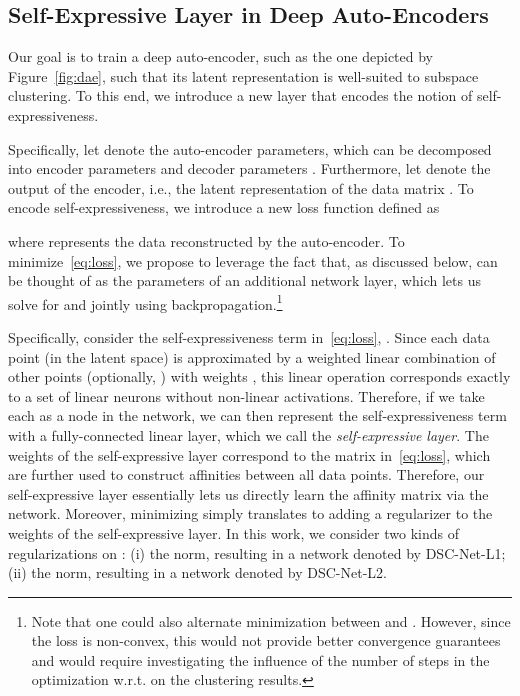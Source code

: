 \documentclass{article}
\begin{document}
\subsection{Self-Expressive Layer in Deep Auto-Encoders}

Our goal is to train a deep auto-encoder, such as the one depicted by  Figure~\ref{fig:dae}, such that its latent representation is well-suited to subspace clustering. To this end, we introduce a new layer that encodes the notion of self-expressiveness. 

Specifically, let  denote the auto-encoder parameters, which can be decomposed into encoder parameters  and decoder parameters . Furthermore, let  denote the output of the encoder, i.e., the latent representation of the data matrix . To encode self-expressiveness, we introduce a new loss function defined as

where  represents the data reconstructed by the auto-encoder. To minimize~\eqref{eq:loss}, we propose to leverage the fact that, as discussed below,  can be thought of as the parameters of an additional network layer, which lets us solve for  and  jointly using backpropagation.\footnote{Note that one could also alternate minimization between  and . However, since the loss is non-convex, this would not provide better convergence guarantees and would require investigating the influence of the number of steps in the optimization w.r.t.  on the clustering results.} 



Specifically, consider the self-expressiveness term in~\eqref{eq:loss},  . Since each data point  (in the latent space) is approximated by a weighted linear combination of other points  (optionally, ) with weights , this linear operation corresponds exactly to a set of linear neurons without non-linear activations. Therefore, if we take each  as a node in the network, we can then represent the self-expressiveness term with a fully-connected linear layer, which we call the {\it self-expressive layer}. The weights of the self-expressive layer correspond to the matrix  in~\eqref{eq:loss}, which are further used to construct affinities between all data points. Therefore, our self-expressive layer essentially lets us directly learn the affinity matrix via the network. Moreover, minimizing  simply translates to adding a regularizer to the weights of the self-expressive layer. In this work, we consider two kinds of regularizations on : (i)  the  norm, resulting in a network denoted by DSC-Net-L1; (ii) the  norm, resulting in a network denoted by DSC-Net-L2.
\end{document}
